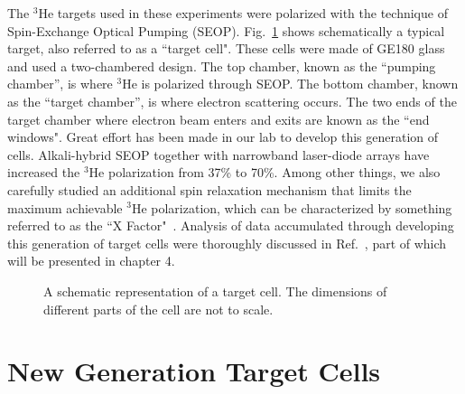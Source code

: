 The $^3$He targets used in these experiments were polarized with the technique of Spin-Exchange Optical Pumping (SEOP). Fig.~\ref{TargetCell} shows schematically a typical target, also referred to as a ``target cell". These cells were made of GE180 glass and used a two-chambered design. The top chamber, known as the “pumping chamber”, is where $^{3}$He is polarized through SEOP. The bottom chamber, known as the “target chamber”, is where electron scattering occurs. The two ends of the target chamber where electron beam enters and exits are known as the ``end windows". Great effort has been made in our lab to develop this generation of cells. Alkali-hybrid SEOP together with narrowband laser-diode arrays have increased the $^{3}$He polarization from 37\% to 70\%. Among other things, we also carefully studied an additional spin relaxation mechanism that limits the maximum achievable $^{3}$He polarization, which can be characterized by something referred to as the ``X Factor"~\cite{PhysRevLett.96.083003}. Analysis of data accumulated through developing this generation of target cells were thoroughly discussed in Ref.~\cite{PhysRevC.91.055205}, part of which will be presented in chapter 4. 

\begin{figure}[H]
	\centering
	\caption{{ A schematic representation of a target cell. The dimensions of different parts of the cell are not to scale.}}
	\label{TargetCell}
\end{figure}

\section{New Generation Target Cells}


